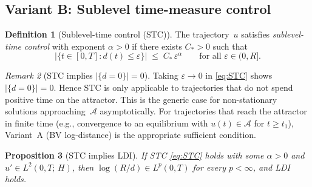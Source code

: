 \documentclass[12pt,a4paper]{article}
\theoremstyle{definition}
\newtheorem{definition}{Definition}[section]
\theoremstyle{plain}
\newtheorem{proposition}[definition]{Proposition}
\theoremstyle{remark}
\newtheorem{remark}[definition]{Remark}
\begin{document}
\subsection{Variant B: Sublevel time-measure control}

\begin{definition}[Sublevel-time control (STC)]
\label{def:STC}
The trajectory~$u$ satisfies \emph{sublevel-time control} with
exponent $\alpha > 0$ if there exists $C_* > 0$ such that
\begin{equation}\label{eq:STC}
  \bigl|\{t \in [0,T] : d(t) \le \varepsilon\}\bigr|
  \;\le\;
  C_*\,\varepsilon^\alpha
  \qquad \text{for all } \varepsilon \in (0, R].
  \tag{STC}
\end{equation}
\end{definition}

\begin{remark}[STC implies $|\{d=0\}| = 0$]
\label{rem:STC-d0}
Taking $\varepsilon \to 0$ in \eqref{eq:STC} shows
$|\{d = 0\}| = 0$.  Hence STC is only applicable to
trajectories that do not spend positive time on the attractor.
This is the generic case for non-stationary solutions
approaching~$\mathcal{A}$ asymptotically.  For trajectories
that reach the attractor in finite time (e.g., convergence
to an equilibrium with $u(t) \in \mathcal{A}$ for
$t \ge t_1$), Variant~A (BV log-distance) is the appropriate
sufficient condition.
\end{remark}

\begin{proposition}[STC implies LDI]
\label{prop:variant-B}
If STC \eqref{eq:STC} holds with some $\alpha > 0$ and
$u' \in L^2(0,T;\,H)$, then
$\log(R/d) \in L^p(0,T)$ for every $p < \infty$, and LDI holds.
\end{proposition}
\end{document}
